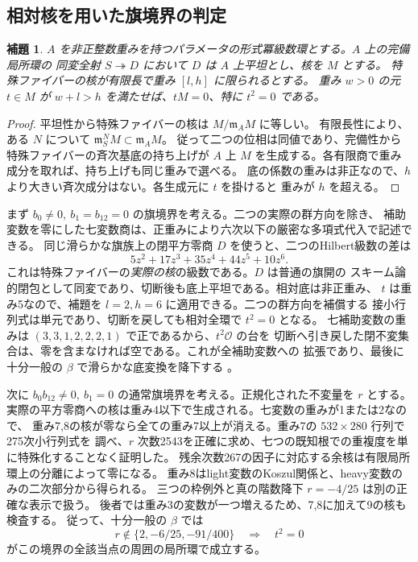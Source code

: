 \documentclass[11pt,a4paper]{ltjsarticle}
\newtheorem{lemma}[theorem]{補題}
\theoremstyle{remark}
\begin{document}
\subsection{相対核を用いた旗境界の判定}
\begin{lemma}
$A$ を非正整数重みを持つパラメータの形式冪級数環とする。$A$ 上の完備局所環の
同変全射 $S\twoheadrightarrow D$ において $D$ は $A$ 上平坦とし、核を $M$ とする。
特殊ファイバーの核が有限長で重み $[l,h]$ に限られるとする。
重み $w>0$ の元 $t\in M$ が $w+l>h$ を満たせば、$tM=0$、特に $t^2=0$ である。
\end{lemma}
\begin{proof}
平坦性から特殊ファイバーの核は $M/\mathfrak m_A M$ に等しい。
有限長性により、ある $N$ について $\mathfrak m_S^N M\subset\mathfrak m_A M$。
従って二つの位相は同値であり、完備性から特殊ファイバーの斉次基底の持ち上げが
$A$ 上 $M$ を生成する。各有限商で重み成分を取れば、持ち上げも同じ重みで選べる。
底の係数の重みは非正なので、$h$ より大きい斉次成分はない。各生成元に $t$ を掛けると
重みが $h$ を超える。
\end{proof}

まず $b_0\ne0,\ b_1=b_{12}=0$ の旗境界を考える。二つの実際の群方向を除き、
補助変数を零にした七変数商は、正重みにより六次以下の厳密な多項式代入で記述できる。
同じ滑らかな旗族上の閉平方零商 $D$ を使うと、二つのHilbert級数の差は
\[
 5z^2+17z^3+35z^4+44z^5+10z^6.
\]
これは特殊ファイバーの\emph{実際の核}の級数である。$D$ は普通の旗開の
スキーム論的閉包として同変であり、切断後も底上平坦である。相対底は非正重み、
$t$ は重み5なので、補題を $l=2,h=6$ に適用できる。二つの群方向を補償する
接小行列式は単元であり、切断を戻しても相対全環で $t^2=0$ となる。
七補助変数の重みは $(3,3,1,2,2,2,1)$ で正であるから、$t^2\mathcal O$ の台を
切断へ引き戻した閉不変集合は、零を含まなければ空である。これが全補助変数への
拡張であり、最後に十分一般の $\beta$ で滑らかな底変換を降下する
\cite{flag-zero-relative-v54}。

次に $b_0b_{12}\ne0,\ b_1=0$ の通常旗境界を考える。正規化された不変量を $r$ とする。
実際の平方零商への核は重み4以下で生成される。七変数の重みが1または2なので、
重み7,8の核が零なら全ての重み7以上が消える。重み7の $532\times280$ 行列で275次小行列式を
調べ、$r$ 次数2543を正確に求め、七つの既知根での重複度を単に特殊化することなく証明した。
残余次数267の因子に対応する余核は有限局所環上の分離によって零になる。
重み8はlight変数のKoszul関係と、heavy変数のみの二次部分から得られる。
三つの枠例外と真の階数降下 $r=-4/25$ は別の正確な表示で扱う。
後者では重み3の変数が一つ増えるため、7,8に加えて9の核も検査する。
従って、十分一般の $\beta$ では
\[
 r\notin\{2,-6/25,-91/400\}\quad\Longrightarrow\quad t^2=0
\]
がこの境界の全該当点の周囲の局所環で成立する\cite{flag-ordinary-v54,flag-true-v54}。
\end{document}
